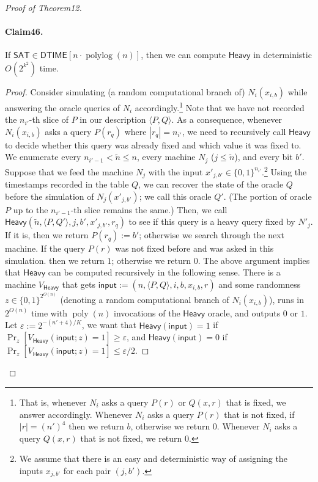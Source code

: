\documentclass[10pt,a4paper]{article}
\begin{document}
\begin{proof}[Proof of Theorem12]
\paragraph{Claim46.} If $\mathsf{SAT}\in\mathsf{DTIME}[n\cdot\operatorname{polylog}(n)]$, then we can compute $\mathsf{Heavy}$ in deterministic $O(2^{k^2})$ time.
\begin{proof}
Consider simulating (a random computational branch of) $N_i(x_{i,b})$ while answering the oracle queries of $N_i$ accordingly.\footnote{That is, whenever $N_i$ asks a query $P(r)$ or $Q(x,r)$ that is fixed, we answer accordingly. Whenever $N_i$ asks a query $P(r)$ that is not fixed, if $|r|=(n')^4$ then we return $b$, otherwise we return $0$. Whenever $N_i$ asks a query $Q(x,r)$ that is not fixed, we return $0$.} Note that we have not recorded the $n_{i'}$-th slice of $P$ in our description $\langle P,Q\rangle$. As a consequence, whenever $N_i(x_{i,b})$ asks a query $P(r_q)$ where $|r_q|=n_{i'}$, we need to recursively call $\mathsf{Heavy}$ to decide whether this query was already fixed and which value it was fixed to. We enumerate every $n_{i'-1}<\tilde n\leq n$, every machine $N_j$ ($j\leq\tilde n$), and every bit $b'$. Suppose that we feed the machine $N_j$ with the input $x'_{j,b'}\in\{0,1\}^{n_{i'}}$.\footnote{We assume that there is an easy and deterministic way of assigning the inputs $x_{j,b'}$ for each pair $(j,b')$.} Using the timestamps recorded in the table $Q$, we can recover the state of the oracle $Q$ before the simulation of $N_j(x'_{j,b'})$; we call this oracle $Q'$. (The portion of oracle $P$ up to the $n_{i'-1}$-th slice remains the same.) Then, we call $\mathsf{Heavy}(\tilde n,\langle P,Q'\rangle,j,b',x'_{j,b'},r_q)$ to see if this query is a heavy query fixed by $N'_j$. If it is, then we return $P(r_q):=b'$; otherwise we search through the next machine. If the query $P(r)$ was not fixed before and was asked in this simulation. then we return $1$; otherwise we return $0$.
The above argument implies that $\mathsf{Heavy}$ can be computed recursively in the following sense. There is a machine $V_{\mathsf{Heavy}}$ that gets $\mathsf{input}:=(n,\langle P,Q\rangle,i,b,x_{i,b},r)$ and some randomness $z\in\{0,1\}^{2^{O(n)}}$ (denoting a random computational branch of $N_i(x_{i,b})$), runs in $2^{O(n)}$ time with $\operatorname{poly}(n)$ invocations of the $\mathsf{Heavy}$ oracle, and outputs $0$ or $1$. Let $\varepsilon:=2^{-(n'+4)/K}$, we want that $\mathsf{Heavy}(\mathsf{input})=1$ if $\Pr_z[V_{\mathsf{Heavy}}(\mathsf{input};z)=1]\geq\varepsilon$, and $\mathsf{Heavy}(\mathsf{input})=0$ if $\Pr_z[V_{\mathsf{Heavy}}(\mathsf{input};z)=1]\leq\varepsilon/2$.

\end{proof}
\end{proof}
\end{document}
